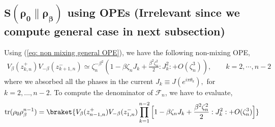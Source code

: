 \documentclass[11pt]{article}
\newcommand{\nn}{\nonumber}
\newcommand{\lb}{\left(}
\newcommand{\rb}{\right)}
\begin{document}
\subsection{\texorpdfstring{$\boldsymbol{S(\rho_0 \| \rho_\beta)}$ using OPEs (Irrelevant since we compute general case in next subsection)}{S(rho 0 rho beta) using OPEs}}
Using (\ref{eq: non mixing general OPE}), we have the following non-mixing OPE,
\begin{align}
    V_{\beta}(z_{k,n}^+)V_{-\beta}(z_{k+1,n}^-) \simeq \zeta_n^{-\beta^2}\lb 1-\beta \zeta_n J_k + \frac{\beta^2\zeta_n^2}{2}:J_k^2: + O(\zeta_n^3)  \rb, \qquad k = 2,\cdots, n-2
\end{align}
where we absorbed all the phases in the current $J_k \equiv J(e^{i\pi\theta_k}),$ for $k=2,\ldots,n-2$.
To compute the denominator of $\mathcal{F}_n$, we have to evaluate,
\begin{align}
     \text{tr}(\rho_0\rho_\beta^{n-1}) = \braket{V_\beta(z_{n-1,n}^+)V_{-\beta}(z_{1,n}^-) \prod_{k=1}^{n-2} \Big[ 1 - \beta \zeta_n J_k + \frac{\beta^2 \zeta_n^2}{2} : J^2_k: + O(\zeta_n^3)\Big] } 
\end{align}
\end{document}
